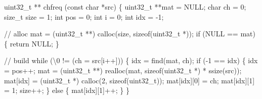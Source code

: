 \documentclass[
  a4paper,
]{scrreprt}
\newenvironment{Shaded}{\begin{snugshade}}{\end{snugshade}}
\newcommand{\CharTok}[1]{\textcolor[rgb]{0.00,0.50,0.00}{#1}}
\newcommand{\CommentTok}[1]{\textcolor[rgb]{0.41,0.41,0.41}{#1}}
\newcommand{\ControlFlowTok}[1]{\textcolor[rgb]{0.85,0.12,0.09}{#1}}
\newcommand{\DataTypeTok}[1]{\textcolor[rgb]{0.47,0.16,0.63}{#1}}
\newcommand{\DecValTok}[1]{\textcolor[rgb]{0.47,0.16,0.63}{#1}}
\newcommand{\KeywordTok}[1]{\textcolor[rgb]{0.85,0.12,0.09}{#1}}
\newcommand{\NormalTok}[1]{\textcolor[rgb]{0.33,0.33,0.33}{#1}}
\newcommand{\OperatorTok}[1]{\textcolor[rgb]{0.00,0.46,0.62}{#1}}
\newcommand{\SpecialCharTok}[1]{\textcolor[rgb]{0.00,0.46,0.62}{#1}}
\theoremstyle{definition}
\theoremstyle{remark}
\begin{document}
\begin{Shaded}
\begin{Highlighting}[numbers=left,,]
\DataTypeTok{uint32\_t} \OperatorTok{**}
\NormalTok{chfreq }\OperatorTok{(}\DataTypeTok{const} \DataTypeTok{char} \OperatorTok{*}\NormalTok{src}\OperatorTok{)} \OperatorTok{\{}
  \DataTypeTok{uint32\_t} \OperatorTok{**}\NormalTok{mat }\OperatorTok{=}\NormalTok{ NULL}\OperatorTok{;}
  \DataTypeTok{char}\NormalTok{ ch }\OperatorTok{=} \DecValTok{0}\OperatorTok{;}
  \DataTypeTok{size\_t}\NormalTok{ size }\OperatorTok{=} \DecValTok{1}\OperatorTok{;}
  \DataTypeTok{int}\NormalTok{ pos }\OperatorTok{=} \DecValTok{0}\OperatorTok{;}
  \DataTypeTok{int}\NormalTok{ i }\OperatorTok{=} \DecValTok{0}\OperatorTok{;}
  \DataTypeTok{int}\NormalTok{ idx }\OperatorTok{=} \OperatorTok{{-}}\DecValTok{1}\OperatorTok{;}

  \CommentTok{// alloc}
\NormalTok{  mat }\OperatorTok{=} \OperatorTok{(}\DataTypeTok{uint32\_t} \OperatorTok{**)}\NormalTok{ calloc}\OperatorTok{(}\NormalTok{size}\OperatorTok{,} \KeywordTok{sizeof}\OperatorTok{(}\DataTypeTok{uint32\_t} \OperatorTok{*));}
  \ControlFlowTok{if} \OperatorTok{(}\NormalTok{NULL }\OperatorTok{==}\NormalTok{ mat}\OperatorTok{)} \OperatorTok{\{} \ControlFlowTok{return}\NormalTok{ NULL}\OperatorTok{;} \OperatorTok{\}}

  \CommentTok{// build}
  \ControlFlowTok{while} \OperatorTok{(}\CharTok{\textquotesingle{}}\SpecialCharTok{\textbackslash{}0}\CharTok{\textquotesingle{}} \OperatorTok{!=} \OperatorTok{(}\NormalTok{ch }\OperatorTok{=}\NormalTok{ src}\OperatorTok{[}\NormalTok{i}\OperatorTok{++]))} \OperatorTok{\{}
\NormalTok{    idx }\OperatorTok{=}\NormalTok{ find}\OperatorTok{(}\NormalTok{mat}\OperatorTok{,}\NormalTok{ ch}\OperatorTok{);}
    \ControlFlowTok{if} \OperatorTok{({-}}\DecValTok{1} \OperatorTok{==}\NormalTok{ idx}\OperatorTok{)} \OperatorTok{\{}
\NormalTok{      idx }\OperatorTok{=}\NormalTok{ pos}\OperatorTok{++;}
\NormalTok{      mat }\OperatorTok{=} \OperatorTok{(}\DataTypeTok{uint32\_t} \OperatorTok{**)}\NormalTok{ realloc}\OperatorTok{(}\NormalTok{mat}\OperatorTok{,} \KeywordTok{sizeof}\OperatorTok{(}\DataTypeTok{uint32\_t} \OperatorTok{*)} \OperatorTok{*}\NormalTok{ ssize}\OperatorTok{(}\NormalTok{src}\OperatorTok{));}
\NormalTok{      mat}\OperatorTok{[}\NormalTok{idx}\OperatorTok{]} \OperatorTok{=} \OperatorTok{(}\DataTypeTok{uint32\_t} \OperatorTok{*)}\NormalTok{ calloc}\OperatorTok{(}\DecValTok{2}\OperatorTok{,} \KeywordTok{sizeof}\OperatorTok{(}\DataTypeTok{uint32\_t}\OperatorTok{));}
\NormalTok{      mat}\OperatorTok{[}\NormalTok{idx}\OperatorTok{][}\DecValTok{0}\OperatorTok{]} \OperatorTok{=}\NormalTok{ ch}\OperatorTok{;}
\NormalTok{      mat}\OperatorTok{[}\NormalTok{idx}\OperatorTok{][}\DecValTok{1}\OperatorTok{]} \OperatorTok{=} \DecValTok{1}\OperatorTok{;}
\NormalTok{      size}\OperatorTok{++;}
    \OperatorTok{\}} \ControlFlowTok{else} \OperatorTok{\{}
\NormalTok{      mat}\OperatorTok{[}\NormalTok{idx}\OperatorTok{][}\DecValTok{1}\OperatorTok{]++;}
    \OperatorTok{\}}
  \OperatorTok{\}}


\end{Highlighting}
\end{Shaded}
\end{document}
